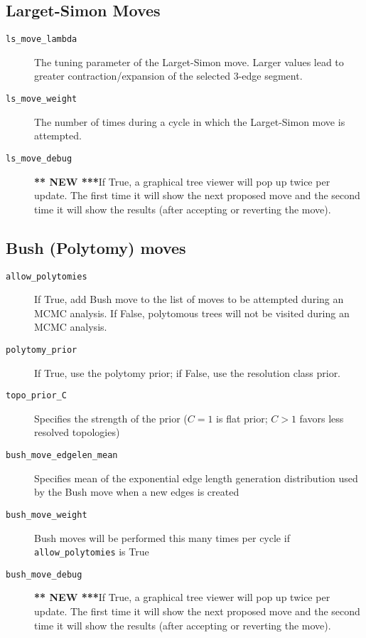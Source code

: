 \documentclass[10pt]{article}
\newcommand{\new}{{\bfseries *** NEW ***}}
\begin{document}
\subsection{Larget-Simon Moves}
\begin{description}
\item[{\tt ls\_move\_lambda}] The tuning parameter of the Larget-Simon move. Larger values lead to greater contraction/expansion of the selected 3-edge segment.
\item[{\tt ls\_move\_weight}] The number of times during a cycle in which the Larget-Simon move is attempted.
\item[{\tt ls\_move\_debug}] \new If True, a graphical tree viewer will pop up twice per update. The first time it will show the next proposed move and the second time it will show the results (after accepting or reverting the move).
\end{description}

\subsection{Bush (Polytomy) moves}
\begin{description}
\item[{\tt allow\_polytomies}] If True, add Bush move to the list of moves to be attempted during an MCMC analysis. If False, polytomous trees will not be visited during an MCMC analysis.
\item[{\tt polytomy\_prior}] If True, use the polytomy prior; if False, use the resolution class prior.
\item[{\tt topo\_prior\_C}] Specifies the strength of the prior ($C = 1$ is flat prior; $C > 1$ favors less resolved topologies)
\item[{\tt bush\_move\_edgelen\_mean}] Specifies mean of the exponential edge length generation distribution used by the Bush move when a new edges is created
\item[{\tt bush\_move\_weight}] Bush moves will be performed this many times per cycle if \verb+allow_polytomies+ is True
\item[{\tt bush\_move\_debug}] \new If True, a graphical tree viewer will pop up twice per update. The first time it will show the next proposed move and the second time it will show the results (after accepting or reverting the move).
\end{description}
\end{document}
